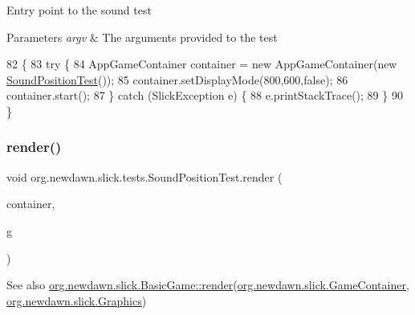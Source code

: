 Entry point to the sound test


\begin{DoxyParams}{Parameters}
{\em argv} & The arguments provided to the test \\
\hline
\end{DoxyParams}

\begin{DoxyCode}
82                                            \{
83         \textcolor{keywordflow}{try} \{
84             AppGameContainer container = \textcolor{keyword}{new} AppGameContainer(\textcolor{keyword}{new} 
      \mbox{\hyperlink{classorg_1_1newdawn_1_1slick_1_1tests_1_1_sound_position_test_a9393035f9627e1f00c37d713d2d32107}{SoundPositionTest}}());
85             container.setDisplayMode(800,600,\textcolor{keyword}{false});
86             container.start();
87         \} \textcolor{keywordflow}{catch} (SlickException e) \{
88             e.printStackTrace();
89         \}
90     \}
\end{DoxyCode}
\mbox{\label{classorg_1_1newdawn_1_1slick_1_1tests_1_1_sound_position_test_a6acffa7d26fc7f9ec5913883ebd40ac0}} 
\subsubsection{\texorpdfstring{render()}{render()}}
{\footnotesize\ttfamily void org.\+newdawn.\+slick.\+tests.\+Sound\+Position\+Test.\+render (\begin{DoxyParamCaption}\item[{\mbox{\hyperlink{classorg_1_1newdawn_1_1slick_1_1_game_container}{Game\+Container}}}]{container,  }\item[{\mbox{\hyperlink{classorg_1_1newdawn_1_1slick_1_1_graphics}{Graphics}}}]{g }\end{DoxyParamCaption})\hspace{0.3cm}{\ttfamily [inline]}}

\begin{DoxySeeAlso}{See also}
\mbox{\hyperlink{interfaceorg_1_1newdawn_1_1slick_1_1_game_af1a4670d43eb3ba04dfcf55ab1975b64}{org.\+newdawn.\+slick.\+Basic\+Game\+::render}}(\mbox{\hyperlink{classorg_1_1newdawn_1_1slick_1_1_game_container}{org.\+newdawn.\+slick.\+Game\+Container}}, \mbox{\hyperlink{classorg_1_1newdawn_1_1slick_1_1_graphics}{org.\+newdawn.\+slick.\+Graphics}}) 
\end{DoxySeeAlso}


